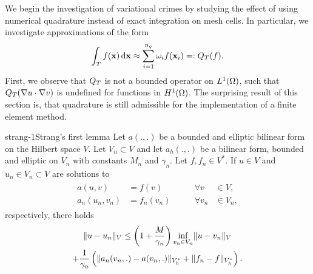 \begin{intro}
  We begin the investigation of variational crimes by studying the
  effect of using numerical quadrature instead of exact integration on
  mesh cells. In particular, we investigate approximations of the form
  \begin{gather}
    \int_T f(\mathbf x)\,\mathrm{d} \mathbf x
    \approx \sum_{i=1}^{n_q} \omega_i f(\mathbf x_i) =: Q_T(f).
  \end{gather}
  First, we observe that $Q_T$ is not a bounded operator on
  $L^1(\Omega)$, such that $Q_T(\nabla u\cdot \nabla v)$ is
  undefined for functions in $H^1(\Omega)$. The surprising result of
  this section is, that quadrature is still admissible for the
  implementation of a finite element method.
\end{intro}

\begin{Lemma*}{strang-1}{Strang's first lemma}
  Let $a(.,.)$ be a bounded and elliptic bilinear form on the Hilbert
  space $V$. Let $V_n\subset V$ and let $a_h(.,.)$ be a bilinear form,
  bounded and elliptic on $V_n$ with constants $M_n$ and
  $\gamma_n$. Let $f, f_n\in V^*$. If $u \in V$ and
  $u_n\in V_n \subset V$ are solutions to
  \begin{gather*}
    \begin{aligned}
      a(u,v) &= f(v) & \qquad\forall v&\in V,\\
      a_n(u_n,v_n) &= f_n(v_n) & \qquad\forall v_n&\in V_n,
    \end{aligned}
  \end{gather*}
  respectively, there holds
  \begin{multline}
    \lVert u-u_n\rVert_V \le \left(1+\frac{M}{\gamma_n}\right)
    \inf_{v_n\in V_n}\lVert u-v_n\rVert_V
    \\+ \frac1{\gamma_n}\left(
    \lVert a_n(v_n,.)-a(v_n,.)\rVert_{V_h^*}
         + \lVert f_n-f\rVert_{V_h^*}\right).
  \end{multline}
\end{Lemma*}

